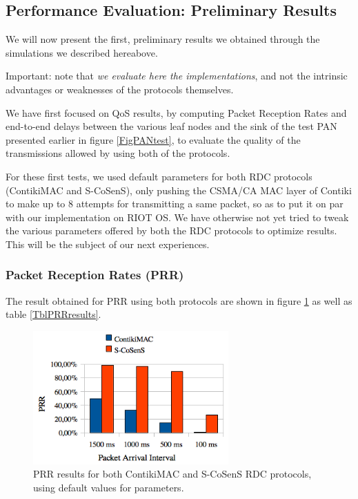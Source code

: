 \documentclass[a4paper,twoside]{article}
\begin{document}
\subsection{Performance Evaluation: Preliminary Results}

We will now present the first, preliminary results we obtained through the
simulations we described hereabove.

Important: note that \emph{we evaluate here the implementations}, and not the
intrinsic advantages or weaknesses of the protocols themselves.

We have first focused on QoS results, by computing Packet Reception Rates
and end-to-end delays between the various leaf nodes and the sink of the test
PAN presented earlier in figure \ref{FigPANtest}, to evaluate the quality
of the transmissions allowed by using both of the protocols.

For these first tests, we used default parameters for both RDC protocols
(ContikiMAC and S-CoSenS), only pushing the CSMA/CA MAC layer of Contiki
to make up to 8 attempts for transmitting a same packet, so as to put it
on par with our implementation on RIOT OS. We have otherwise not yet
tried to tweak the various parameters offered by both the RDC protocols
to optimize results. This will be the subject of our next experiences.

\subsubsection{Packet Reception Rates (PRR)}

The result obtained for PRR using both protocols are shown in figure
\ref{FigPRRresults} as well as table \ref{TblPRRresults}.

\begin{figure}
  \centering
  \includegraphics[width=7.5cm]{PRRgraph.png}
  \caption{PRR results for both ContikiMAC and S-CoSenS RDC protocols,
           using default values for parameters.}
  \label{FigPRRresults}
\end{figure}
\end{document}
